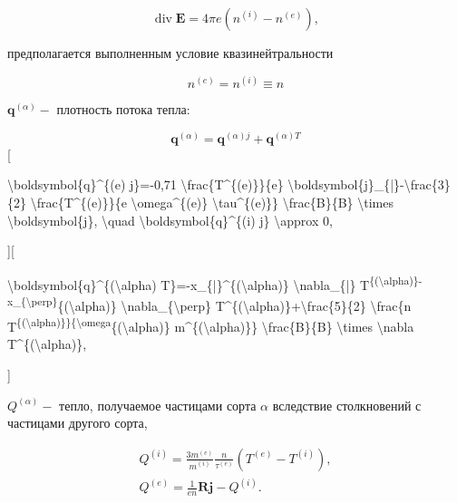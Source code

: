 \documentclass[10pt]{article}
\begin{document}
\[

\operatorname{div} \boldsymbol{E}=4 \pi e\left(n^{(i)}-n^{(e)}\right),

\]



предполагается выполненным условие квазинейтральности



\[

n^{(e)}=n^{(i)} \equiv n

\]



$\boldsymbol{q}^{(\alpha)}-$ плотность потока тепла:



\[

\boldsymbol{q}^{(\alpha)}=\boldsymbol{q}^{(\alpha) j}+\boldsymbol{q}^{(\alpha) T}

\][



\textbackslash boldsymbol\{q\}\^{}\{(e) j\}=-0,71 \textbackslash frac\{T\^{}\{(e)\}\}\{e\} \textbackslash boldsymbol\{j\}\_\{|\}-\textbackslash frac\{3\}\{2\} \textbackslash frac\{T\^{}\{(e)\}\}\{e \textbackslash omega\^{}\{(e)\} \textbackslash tau\^{}\{(e)\}\} \textbackslash frac\{B\}\{B\} \textbackslash times \textbackslash boldsymbol\{j\}, \textbackslash quad \textbackslash boldsymbol\{q\}\^{}\{(i) j\} \textbackslash approx 0,



][



\textbackslash boldsymbol\{q\}\^{}\{(\textbackslash alpha) T\}=-x\_\{|\}\^{}\{(\textbackslash alpha)\} \textbackslash nabla\_\{|\} T\textsuperscript{\{(\textbackslash alpha)\}-x\_\{\textbackslash perp\}}\{(\textbackslash alpha)\} \textbackslash nabla\_\{\textbackslash perp\} T\^{}\{(\textbackslash alpha)\}+\textbackslash frac\{5\}\{2\} \textbackslash frac\{n T\textsuperscript{\{(\textbackslash alpha)\}\}\{\textbackslash omega}\{(\textbackslash alpha)\} m\^{}\{(\textbackslash alpha)\}\} \textbackslash frac\{B\}\{B\} \textbackslash times \textbackslash nabla T\^{}\{(\textbackslash alpha)\},

]



$Q^{(\alpha)}-$ тепло, получаемое частицами сорта $\alpha$ вследствие столкновений с частицами другого сорта,



\[

\begin{gathered}

Q^{(i)}=\frac{3 m^{(e)}}{m^{(i)}} \frac{n}{\tau^{(e)}}\left(T^{(e)}-T^{(i)}\right), \\

Q^{(e)}=\frac{1}{e n} \boldsymbol{R j}-Q^{(i)} .

\end{gathered}

\]
\end{document}
